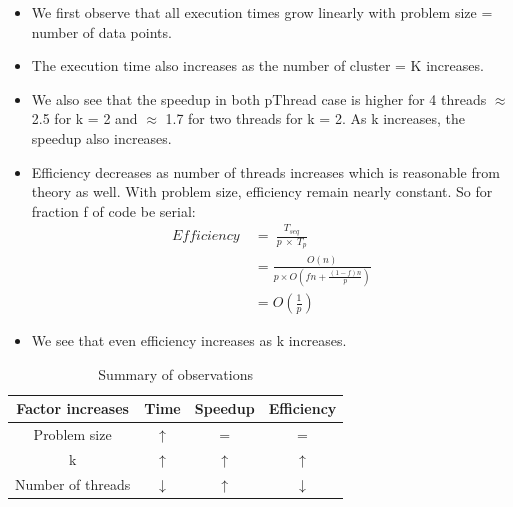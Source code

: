 \documentclass[letter, 11pt, margin=1in]{article}
\begin{document}
\begin{itemize}
    \item We first observe that all execution times grow linearly with problem size = number of data points.
    \item The execution time also increases as the number of cluster = K increases.
    \item We also see that the speedup in both pThread case is higher for 4 threads $\approx$ 2.5 for k = 2 and $\approx$ 1.7 for two threads for k = 2. As k increases, the speedup also increases.
    \item Efficiency decreases as number of threads increases which is reasonable from theory as well. With problem size, efficiency remain nearly constant. So for fraction f of code be serial: \\
    \begin{align*}
        Efficiency\ &=\ \frac{T_{seq}}{p\ \times\ T_p}\\
        &= \frac{O(n)}{p \times O(fn + \frac{(1-f)n}{p})}\\
        &= O(\frac{1}{p})
    \end{align*}
    \item We see that even efficiency increases as k increases.
\end{itemize}

\begin{table}[h]
    \centering
    \begin{tabular}{|c|c|c|c|}
    \hline
        Factor increases & Time & Speedup & Efficiency  \\ \hline \hline
        Problem size  & $\uparrow$ & = & = \\ \hline
        k & $\uparrow$ & $\uparrow$ & $\uparrow$ \\ \hline
        Number of threads & $\downarrow$ & $\uparrow$ & $\downarrow$ \\ \hline
    \end{tabular}
    \caption{Summary of observations}
    \label{tab:my_label}
\end{table}
\end{document}
